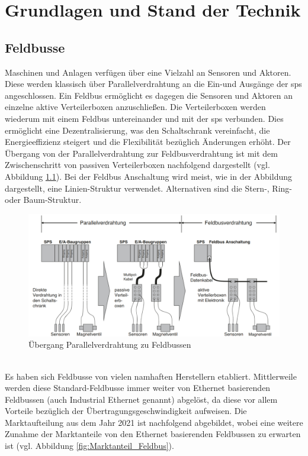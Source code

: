 \documentclass[ a4paper,
                oneside,
                toc=bibliography,
                toc=listof
                ]{scrbook}
\begin{document}
	\chapter{Grundlagen und Stand der Technik}
	
	\section{Feldbusse}
	\label{sec:Feldbus}
	Maschinen und Anlagen verfügen über eine Vielzahl an Sensoren und Aktoren. Diese werden klassisch über Parallelverdrahtung an die Ein-und Ausgänge der \ac{sps} angeschlossen. Ein Feldbus ermöglicht es dagegen die Sensoren und Aktoren an einzelne aktive Verteilerboxen anzuschließen. Die Verteilerboxen werden wiederum mit einem Feldbus untereinander und mit der \ac{sps} verbunden. Dies ermöglicht eine Dezentralisierung, was den Schaltschrank vereinfacht, die Energieeffizienz steigert und die Flexibilität bezüglich Änderungen erhöht. Der Übergang von der Parallelverdrahtung zur Feldbusverdrahtung ist mit dem Zwischenschritt von passiven Verteilerboxen nachfolgend dargestellt (vgl. Abbildung \ref{fig:Parallel_vs_Feldbus}). Bei der Feldbus Anschaltung wird meist, wie in der Abbildung dargestellt, eine Linien-Struktur verwendet. Alternativen sind die Stern-, Ring- oder Baum-Struktur. \cite{hering2012elektrotechnik}
	\begin{figure}[!ht]
		\centering
		\includegraphics[width=1.0\linewidth]{./images/Parallelverdrahtung_Feldbus.png}
		\caption{Übergang Parallelverdrahtung zu Feldbussen \cite{hering2012elektrotechnik}}
		\label{fig:Parallel_vs_Feldbus}
	\end{figure}\\
	Es haben sich Feldbusse von vielen namhaften Herstellern etabliert. Mittlerweile werden diese Standard-Feldbusse immer weiter von Ethernet basierenden Feldbussen (auch Industrial Ethernet genannt) abgelöst, da diese vor allem Vorteile bezüglich der Übertragungsgeschwindigkeit aufweisen. Die Marktaufteilung aus dem Jahr 2021 ist nachfolgend abgebildet, wobei eine weitere Zunahme der Marktanteile von den Ethernet basierenden Feldbussen zu erwarten ist (vgl. Abbildung \ref{fig:Marktanteil_Feldbus}). \cite{hering2012elektrotechnik} \cite{Marktanteile_HMS}\\
\end{document}
